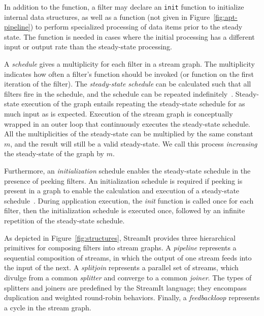In addition to the \work function, a filter may declare an {\tt init}
function to initialize internal data structures, as well as a 
 \prework function (not given in Figure~\ref{fig:apt-pipeline}) to
perform specialized processing of data items prior to the steady
state.  The \prework function is needed in cases where the initial
processing has a different input or output rate than the steady-state
processing.

A {\it schedule} gives a multiplicity for each filter in a stream
graph.  The multiplicity indicates how often a filter's \work function
should be invoked (or \prework function on the first iteration of the filter).  The
{\it steady-state schedule} can be calculated such that all filters
fire in the schedule, and the schedule can be repeated
indefinitely~\cite{lee87}.  Steady-state execution of the graph
entails repeating the steady-state schedule for as much input as is
expected.  Execution of the stream graph is conceptually wrapped in an
outer loop that continuously executes the steady-state schedule.  All
the multiplicities of the steady-state can be multiplied by the same
constant $m$, and the result will still be a valid steady-state.  We
call this process {\it increasing} the steady-state of the graph by
$m$.

Furthermore, an {\it initialization} schedule enables the steady-state
schedule in the presence of peeking filters.  An initialization
schedule is required if peeking is present in a graph to enable the
calculation and execution of a steady-state
schedule~\cite{karczmarek-lctes03}.  During application execution, the
{\it init} function is called once for each filter, then the
initialization schedule is executed once, followed by an infinite
repetition of the steady-state schedule.

As depicted in Figure~\ref{fig:structures}, StreamIt provides three
hierarchical primitives for composing filters into stream graphs.  A
{\it pipeline} represents a sequential composition of streams, in
which the output of one stream feeds into the input of the next.  A
{\it splitjoin} represents a parallel set of streams, which divulge
from a common {\it splitter} and converge to a common {\it joiner}.
The types of splitters and joiners are predefined by the StreamIt
language; they encompass duplication and weighted round-robin
behaviors.  Finally, a {\it feedbackloop} represents a cycle in the
stream graph.

